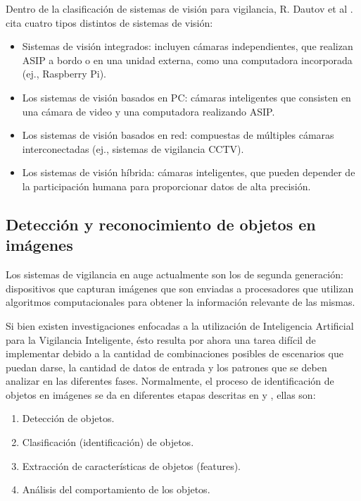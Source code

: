 \documentclass[a4paper,12pt,twoside]{article}
\begin{document}
Dentro de la clasificación de sistemas de visión para vigilancia, R. Dautov et al \cite{dautov}. cita cuatro tipos distintos de sistemas de visión:
\begin{itemize}
	\item Sistemas de visión integrados: incluyen cámaras independientes, que realizan ASIP a bordo o en una unidad externa, como una computadora incorporada (ej., Raspberry Pi).\\	
	\item Los sistemas de visión basados en PC: cámaras inteligentes que consisten en una cámara de video y una computadora  realizando ASIP.\\	
	\item Los sistemas de visión basados en red: compuestas de múltiples cámaras interconectadas (ej., sistemas de vigilancia CCTV).\\	
	\item Los sistemas de visión híbrida: cámaras inteligentes, que pueden depender de la participación humana para proporcionar datos de alta precisión.\\	
\end{itemize}

\subsection{Detección y reconocimiento de objetos en imágenes}

Los sistemas de vigilancia en auge actualmente son los de segunda generación: dispositivos que capturan imágenes que son enviadas a procesadores que utilizan algoritmos computacionales para obtener la información relevante de las mismas. \par

Si bien existen investigaciones enfocadas a la utilización de Inteligencia Artificial para la Vigilancia Inteligente, ésto resulta por ahora una tarea difícil de implementar debido a la cantidad de combinaciones posibles de escenarios que puedan darse, la cantidad de datos de entrada y los patrones que se deben analizar en las diferentes fases. Normalmente, el proceso de identificación de objetos en imágenes se da en diferentes etapas descritas en \cite{lozano} y \cite{kamarudin}, ellas son:	
\begin{enumerate}
	\baselineskip 0pt
	\item Detección de objetos.\\	
	\item Clasificación (identificación) de objetos.\\
	\item Extracción de características de objetos (features).\\
	\item Análisis del comportamiento de los objetos.\\
\end{enumerate}	\baselineskip 14pt
	
\end{document}
